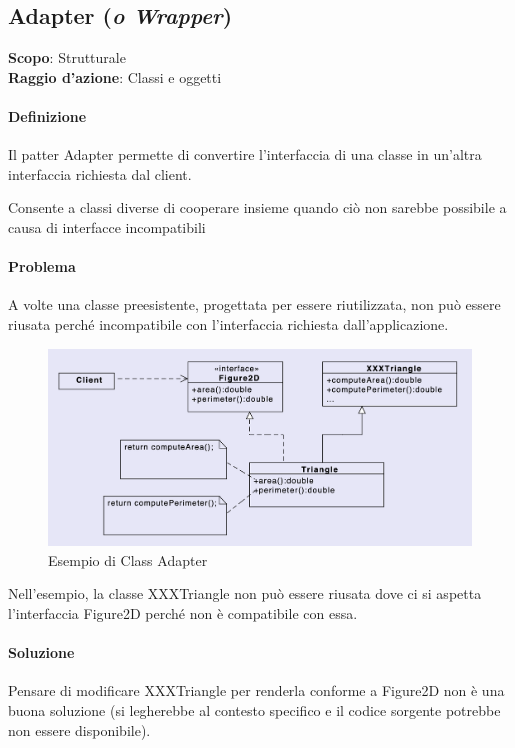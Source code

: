 \subsection{Adapter (\textit{o Wrapper})}
\label{adapter}

\textbf{Scopo}: Strutturale \\
\textbf{Raggio d'azione}: Classi e oggetti

\paragraph{Definizione}
Il patter Adapter permette di convertire l'interfaccia di una classe in un'altra interfaccia richiesta dal client.

Consente a classi diverse di cooperare insieme quando ciò non sarebbe possibile a causa di interfacce incompatibili

\paragraph{Problema} A volte una classe preesistente, progettata per essere riutilizzata, non può essere riusata perché incompatibile con l'interfaccia richiesta dall'applicazione.

\begin{figure}[H]
    \centering
    \includegraphics[width=1\linewidth]{assets/pattern/adapter/class-adapter.png}
    \caption{Esempio di Class Adapter}
\end{figure}

Nell’esempio, la classe XXXTriangle non può essere riusata dove ci si aspetta l’interfaccia Figure2D perché non è compatibile con essa.

\paragraph{Soluzione} Pensare di modificare XXXTriangle per renderla conforme a Figure2D non è una buona soluzione (si legherebbe al contesto specifico e il codice sorgente potrebbe non essere disponibile).

